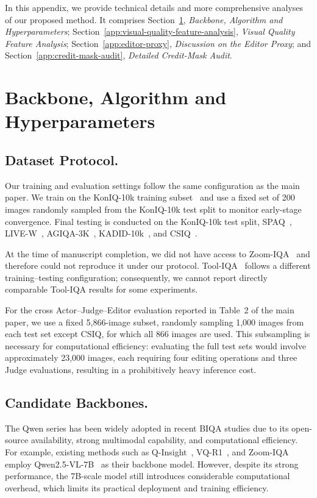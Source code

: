 
In this appendix, we provide technical details and more comprehensive analyses
of our proposed method. It comprises Section~\ref{app:backbone},
\emph{Backbone, Algorithm and Hyperparameters};
Section~\ref{app:visual-quality-feature-analysis},
\emph{Visual Quality Feature Analysis}; Section~\ref{app:editor-proxy},
\emph{Discussion on the Editor Proxy}; and
Section~\ref{app:credit-mask-audit}, \emph{Detailed Credit-Mask Audit}.
\section{Backbone, Algorithm and Hyperparameters}
\label{app:backbone}

\subsection{Dataset Protocol.}
Our training and evaluation settings follow the same configuration as the main
paper. We train on the KonIQ-10k training subset~\citep{koniq} and use a fixed
set of 200 images randomly sampled from the KonIQ-10k test split to monitor
early-stage convergence. Final testing is conducted on the KonIQ-10k test
split, SPAQ~\citep{spaq}, LIVE-W~\citep{live-w},
AGIQA-3K~\citep{agiqa}, KADID-10k~\citep{kadid}, and CSIQ~\citep{csiq}.

At the time of manuscript completion, we did not have access to
Zoom-IQA~\citep{zoom-iqa} and therefore could not reproduce it under our
protocol. Tool-IQA~\citep{tool-iqa} follows a different training--testing
configuration; consequently, we cannot report directly comparable Tool-IQA
results for some experiments.

For the cross Actor--Judge--Editor evaluation reported in Table~2 of the main
paper, we use a fixed 5,866-image subset, randomly sampling 1,000 images from
each test set except CSIQ, for which all 866 images are used. This subsampling
is necessary for computational efficiency: evaluating the full test sets would
involve approximately 23,000 images, each requiring four editing operations
and three Judge evaluations, resulting in a prohibitively heavy inference
cost.

\subsection{Candidate Backbones.}
The Qwen series has been widely adopted in recent BIQA studies due to its open-source availability, strong multimodal capability, and computational efficiency.
For example, existing methods such as Q-Insight~\citep{q-insight},
VQ-R1~\citep{Visualquality-r1}, and Zoom-IQA~\citep{zoom-iqa} employ
Qwen2.5-VL-7B~\citep{qwen2.5} as their backbone model.
However, despite its strong performance, the 7B-scale model still introduces considerable computational overhead, which limits its practical deployment and training efficiency.

